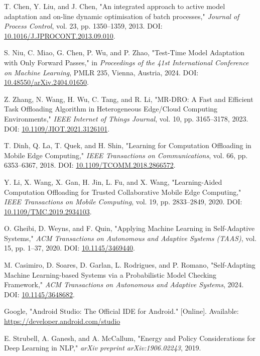 \begin{thebibliography}{00}
T. Chen, Y. Liu, and J. Chen,
"An integrated approach to active model adaptation and on-line dynamic optimisation of batch processes,"
\textit{Journal of Process Control}, vol. 23, pp. 1350--1359, 2013.
DOI: \href{https://doi.org/10.1016/J.JPROCONT.2013.09.010}{10.1016/J.JPROCONT.2013.09.010}.

S. Niu, C. Miao, G. Chen, P. Wu, and P. Zhao,
"Test-Time Model Adaptation with Only Forward Passes,"
in \textit{Proceedings of the 41st International Conference on Machine Learning}, PMLR 235, Vienna, Austria, 2024.
DOI: \href{https://doi.org/10.48550/arXiv.2404.01650}{10.48550/arXiv.2404.01650}.

Z. Zhang, N. Wang, H. Wu, C. Tang, and R. Li,
"MR-DRO: A Fast and Efficient Task Offloading Algorithm in Heterogeneous Edge/Cloud Computing Environments,"
\textit{IEEE Internet of Things Journal}, vol. 10, pp. 3165--3178, 2023.
DOI: \href{https://doi.org/10.1109/JIOT.2021.3126101}{10.1109/JIOT.2021.3126101}.

T. Dinh, Q. La, T. Quek, and H. Shin,
"Learning for Computation Offloading in Mobile Edge Computing,"
\textit{IEEE Transactions on Communications}, vol. 66, pp. 6353--6367, 2018.
DOI: \href{https://doi.org/10.1109/TCOMM.2018.2866572}{10.1109/TCOMM.2018.2866572}.

Y. Li, X. Wang, X. Gan, H. Jin, L. Fu, and X. Wang,
"Learning-Aided Computation Offloading for Trusted Collaborative Mobile Edge Computing,"
\textit{IEEE Transactions on Mobile Computing}, vol. 19, pp. 2833--2849, 2020.
DOI: \href{https://doi.org/10.1109/TMC.2019.2934103}{10.1109/TMC.2019.2934103}.

O. Gheibi, D. Weyns, and F. Quin,
"Applying Machine Learning in Self-Adaptive Systems,"
\textit{ACM Transactions on Autonomous and Adaptive Systems (TAAS)}, vol. 15, pp. 1--37, 2020.
DOI: \href{https://doi.org/10.1145/3469440}{10.1145/3469440}.

M. Casimiro, D. Soares, D. Garlan, L. Rodrigues, and P. Romano,
"Self-Adapting Machine Learning-based Systems via a Probabilistic Model Checking Framework,"
\textit{ACM Transactions on Autonomous and Adaptive Systems}, 2024.
DOI: \href{https://doi.org/10.1145/3648682}{10.1145/3648682}.

Google, "Android Studio: The Official IDE for Android." [Online]. Available: \href{https://developer.android.com/studio}{https://developer.android.com/studio}

E. Strubell, A. Ganesh, and A. McCallum,
"Energy and Policy Considerations for Deep Learning in NLP,"
\textit{arXiv preprint arXiv:1906.02243}, 2019.


\end{thebibliography}
